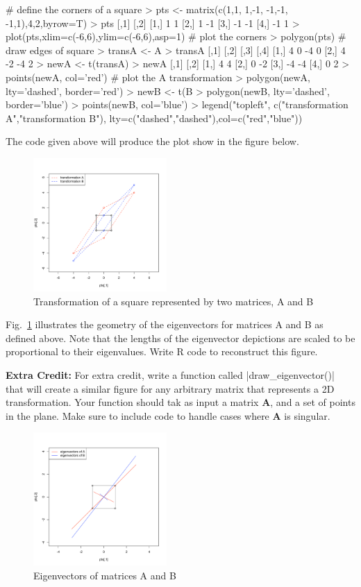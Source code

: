 \begin{R}
# define the corners of a square
> pts <- matrix(c(1,1, 1,-1, -1,-1, -1,1),4,2,byrow=T)
> pts
     [,1] [,2]
[1,]    1    1
[2,]    1   -1
[3,]   -1   -1
[4,]   -1    1
> plot(pts,xlim=c(-6,6),ylim=c(-6,6),asp=1) # plot the corners
> polygon(pts) # draw edges of square
> transA <- A %
> transA
     [,1] [,2] [,3] [,4]
[1,]    4    0   -4    0
[2,]    4   -2   -4    2
> newA <- t(transA)
> newA
     [,1] [,2]
[1,]    4    4
[2,]    0   -2
[3,]   -4   -4
[4,]    0    2
> points(newA, col='red') # plot the A transformation
> polygon(newA, lty='dashed', border='red')
> newB <- t(B %
> polygon(newB, lty='dashed', border='blue')
> points(newB, col='blue')
> legend("topleft", c("transformation A","transformation B"),
lty=c("dashed","dashed"),col=c("red","blue"))
\end{R}
The code given above will produce the plot show in the figure below.

\begin{figure}[htbp]
\centering
\includegraphics[width=2in]{./figures/hands-on5/eigen-transform.pdf}
\caption{Transformation of a square represented by two matrices, A and
B}
\end{figure}

\begin{assignment}
Fig.~\ref{fig:eigen} illustrates the geometry of the eigenvectors for matrices A and B as defined above.  Note that the lengths of the eigenvector depictions are scaled to be proportional to their eigenvalues. Write R code to reconstruct this figure.

\medskip

\textbf{Extra Credit:} For extra credit, write a function called |draw_eigenvector()| that will create a similar figure for any arbitrary matrix that represents a 2D transformation. Your function should tak as input a matrix $\mathbf{A}$, and a set of points in the plane.  Make sure to include code to handle cases where $\mathbf{A}$ is singular.
\end{assignment}

\begin{figure}[htbp]
\centering
\includegraphics[width=2in]{./figures/hands-on5/eigen-ECplot.pdf}
\caption{Eigenvectors of matrices A and B \label{fig:eigen}}
\end{figure}